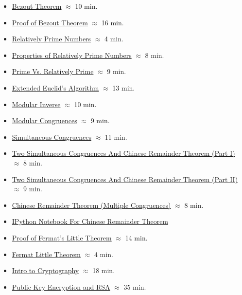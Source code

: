 \begin{itemize}
    \item \href{https://applied.cs.colorado.edu/mod/hvp/view.php?id=51716}{Bezout Theorem} $\approx$ 10 min.
    \item \href{https://applied.cs.colorado.edu/mod/hvp/view.php?id=51717}{Proof of Bezout Theorem} $\approx$ 16 min.
    \item \href{https://applied.cs.colorado.edu/mod/hvp/view.php?id=51718}{Relatively Prime Numbers} $\approx$ 4 min.
    \item \href{https://applied.cs.colorado.edu/mod/hvp/view.php?id=51719}{Properties of Relatively Prime Numbers} $\approx$ 8 min.
    \item \href{https://applied.cs.colorado.edu/mod/hvp/view.php?id=51720}{Prime Vs. Relatively Prime} $\approx$ 9 min.
    \item \href{https://applied.cs.colorado.edu/mod/hvp/view.php?id=51722}{Extended Euclid's Algorithm} $\approx$ 13 min.
    \item \href{https://applied.cs.colorado.edu/mod/hvp/view.php?id=51723}{Modular Inverse} $\approx$ 10 min.
    \item \href{https://applied.cs.colorado.edu/mod/hvp/view.php?id=51724}{Modular Congruences} $\approx$ 9 min.
    \item \href{https://applied.cs.colorado.edu/mod/hvp/view.php?id=51725}{Simultaneous Congruences} $\approx$ 11 min.
    \item \href{https://applied.cs.colorado.edu/mod/hvp/view.php?id=51726}{Two Simultaneous Congruences And Chinese Remainder Theorem (Part I)} $\approx$ 8 min.
    \item \href{https://applied.cs.colorado.edu/mod/hvp/view.php?id=51727}{Two Simultaneous Congruences And Chinese Remainder Theorem (Part II)} $\approx$ 9 min.
    \item \href{https://applied.cs.colorado.edu/mod/hvp/view.php?id=51728}{Chinese Remainder Theorem (Multiple Congruences)} $\approx$ 8 min.
    \item \href{https://github.com/sriram0339/notebooks/blob/master/chinese-remainder-theorem.ipynb}{IPython Notebook For Chinese Remainder Theorem}
    \item \href{https://applied.cs.colorado.edu/mod/hvp/view.php?id=51730}{Proof of Fermat's Little Theorem} $\approx$ 14 min.
    \item \href{https://applied.cs.colorado.edu/mod/hvp/view.php?id=51731}{Fermat Little Theorem} $\approx$ 4 min.
    \item \href{https://applied.cs.colorado.edu/mod/hvp/view.php?id=51732}{Intro to Cryptography} $\approx$ 18 min.
    \item \href{https://applied.cs.colorado.edu/mod/hvp/view.php?id=51733}{Public Key Encryption and RSA} $\approx$ 35 min.
\end{itemize}

